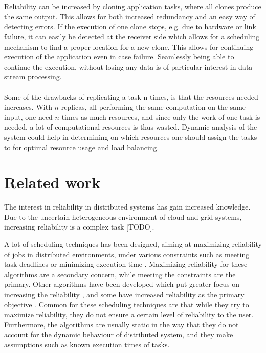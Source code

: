 \documentclass{cslthse-msc}
\begin{document}
\\\\
Reliability can be increased by cloning application tasks, where all clones produce the same output. This allows for both increased redundancy and an easy way of detecting errors. If the execution of one clone stops, e.g. due to hardware or link failure, it can easily be detected at the receiver side which allows for a scheduling mechanism to find a proper location for a new clone. This allows for continuing execution of the application even in case failure. Seamlessly being able to continue the execution, without losing any data is of particular interest in data stream processing.
\\\\
Some of the drawbacks of replicating a task n times, is that the resources needed increases. With $n$ replicas, all performing the same computation on the same input, one need $n$ times as much resources, and since only the work of one task is needed, a lot of computational resources is thus wasted. Dynamic analysis of the system could help in determining on which resources one should assign the tasks to for optimal resource usage and load balancing. 


\section{Related work} \label{sec:related_work}
The interest in reliability in distributed systems has gain increased knowledge. Due to the uncertain heterogeneous environment of cloud and grid systems, increasing reliability is a complex task [TODO]. %

A lot of scheduling techniques has been designed, aiming at maximizing reliability of jobs in distributed environments, under various constraints such as meeting task deadlines or minimizing execution time \cite{algoOptTimeMaxRel} \cite{optTaskAllocationForMaxRel} \cite{taskAllocation} \cite{taskAllocationSwarm} \cite{algoMaxRelEndToEndConstraint} \cite{algoMinExTime}  \cite{schedReplicas}. Maximizing reliability for these algorithms are a secondary concern, while meeting the constraints are the primary. Other algorithms have been developed which put greater focus on increasing the reliability \cite{optResourceAllMaxPerformance} \cite{matchSchedAlgoMinFailure}, and some have increased reliability as the primary objective \cite{safetyRelTaskAllocation} \cite{improvedTaskAllMaxRel}. Common for these scheduling techniques are that while they try to maximize reliability, they do not ensure a certain level of reliability to the user. Furthermore, the algorithms are usually static in the way that they do not account for the dynamic behaviour of distributed system, and they make assumptions such as known execution times of tasks.
\end{document}
